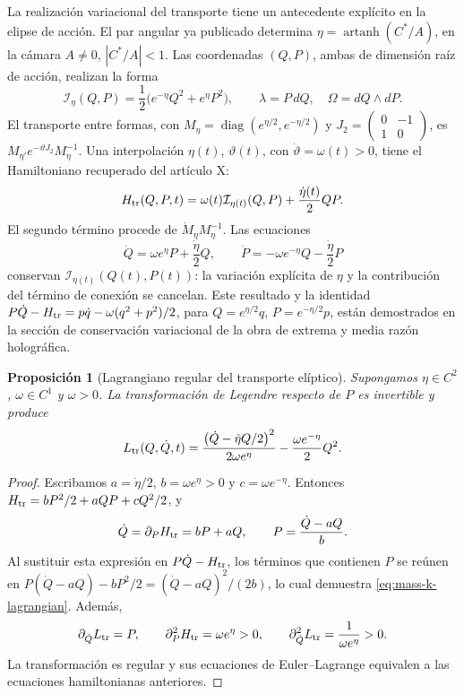 \documentclass[a4paper,10pt]{article}
\newtheorem{proposition}[theorem]{Proposición}
\theoremstyle{definition}\newtheorem{definition}[theorem]{Definición}
\theoremstyle{remark}\newtheorem{remark}[theorem]{Observación}
\numberwithin{equation}{section}
\begin{document}
La realización variacional del transporte tiene un antecedente explícito
en la elipse de acción. El par angular ya publicado determina
\(\eta=\operatorname{artanh}(C^*/A)\), en la cámara
\(A\ne0\), \(|C^*/A|<1\). Las coordenadas \((Q,P)\), ambas de
dimensión raíz de acción, realizan la forma
\[
 \mathcal I_\eta(Q,P)=\frac12\bigl(e^{-\eta}Q^2+e^\eta P^2\bigr),
 \qquad \lambda=P\,dQ,\quad \Omega=dQ\wedge dP.
\]
El transporte entre formas, con
\(M_\eta=\operatorname{diag}(e^{\eta/2},e^{-\eta/2})\) y
\(J_2=\left(\begin{smallmatrix}0&-1\\1&0\end{smallmatrix}\right)\),
es \(M_{\eta'}e^{-\vartheta J_2}M_\eta^{-1}\). Una
interpolación \(\eta(t)\), \(\vartheta(t)\), con
\(\dot\vartheta=\omega(t)>0\), tiene el Hamiltoniano recuperado
del artículo X:
\begin{equation}
 H_{\rm tr}(Q,P,t)=\omega(t)\mathcal I_{\eta(t)}(Q,P)
                 +\frac{\dot\eta(t)}2QP.
 \label{eq:mass-k-hamiltonian}
\end{equation}
El segundo término procede de \(\dot M_\eta M_\eta^{-1}\).
Las ecuaciones
\[
 \dot Q=\omega e^\eta P+\frac{\dot\eta}2Q,
 \qquad
 \dot P=-\omega e^{-\eta}Q-\frac{\dot\eta}2P
\]
conservan \(\mathcal I_{\eta(t)}(Q(t),P(t))\): la variación
explícita de \(\eta\) y la contribución del término de conexión
se cancelan. Este resultado y la identidad
\(P\dot Q-H_{\rm tr}=p\dot q-\omega(q^2+p^2)/2\), para
\(Q=e^{\eta/2}q\), \(P=e^{-\eta/2}p\), están demostrados
en la sección de conservación variacional de la obra de extrema y
media razón holográfica.

\begin{proposition}[Lagrangiano regular del transporte elíptico]
Supongamos \(\eta\in C^2\), \(\omega\in C^1\) y \(\omega>0\).
La transformación de Legendre respecto de \(P\) es invertible y
produce
\begin{equation}
 L_{\rm tr}(Q,\dot Q,t)=
 \frac{\bigl(\dot Q-\dot\eta Q/2\bigr)^2}{2\omega e^\eta}
 -\frac{\omega e^{-\eta}}2Q^2.
 \label{eq:mass-k-lagrangian}
\end{equation}
\end{proposition}
\begin{proof}
Escribamos \(a=\dot\eta/2\), \(b=\omega e^\eta>0\) y
\(c=\omega e^{-\eta}\). Entonces
\(H_{\rm tr}=bP^2/2+aQP+cQ^2/2\), y
\[
 \dot Q=\partial_PH_{\rm tr}=bP+aQ,
 \qquad P=\frac{\dot Q-aQ}{b}.
\]
Al sustituir esta expresión en \(P\dot Q-H_{\rm tr}\), los
términos que contienen \(P\) se reúnen en
\(P(\dot Q-aQ)-bP^2/2=(\dot Q-aQ)^2/(2b)\), lo cual
demuestra \eqref{eq:mass-k-lagrangian}. Además,
\[
 \partial_{\dot Q}L_{\rm tr}=P,
 \qquad
 \partial_P^2H_{\rm tr}=\omega e^\eta>0,
 \qquad
 \partial_{\dot Q}^2L_{\rm tr}=\frac1{\omega e^\eta}>0.
\]
La transformación es regular y sus ecuaciones de Euler--Lagrange
equivalen a las ecuaciones hamiltonianas anteriores.
\end{proof}
\end{document}
